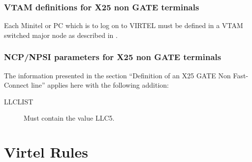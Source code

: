 \documentclass[letterpaper,10pt,english]{sphinxmanual}
\begin{document}

\subsection{VTAM definitions for X25 non GATE terminals}
\label{\detokenize{connectivity_guide:index-88}}\label{\detokenize{connectivity_guide:vtam-definitions-for-x25-non-gate-terminals}}
Each Minitel or PC which is to log on to VIRTEL must be defined in a VTAM switched major node as described in {\hyperref[\detokenize{connectivity_guide:v457cn-x25gateline}]{}}.


\subsection{NCP/NPSI parameters for X25 non GATE terminals}
\label{\detokenize{connectivity_guide:index-89}}\label{\detokenize{connectivity_guide:ncp-npsi-parameters-for-x25-non-gate-terminals}}
The information presented in the section “Definition of an X25 GATE Non Fast-Connect line” applies here with the following addition:

\begin{description}
\item[{LLCLIST}] \leavevmode
Must contain the value LLC5.

\end{description}


\chapter{Virtel Rules}
\label{\detokenize{connectivity_guide:virtel-rules}}\label{\detokenize{connectivity_guide:index-90}}\label{\detokenize{connectivity_guide:v457cn-virtelrules}}
\end{document}
